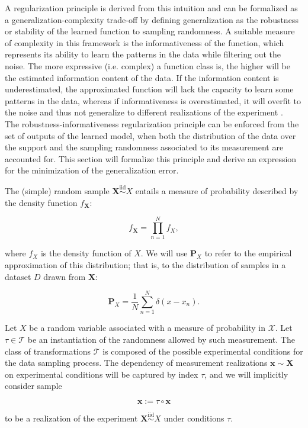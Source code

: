 A regularization principle is derived from this intuition and can be formalized as a
generalization-complexity trade-off by defining generalization as the robustness or stability
of the learned function to sampling randomness. A suitable measure of complexity in this framework
is the informativeness of the function, which represents its ability to learn the patterns in the
data while filtering out the noise. The more expressive (i.e. complex) a function class is,
the higher will be the estimated information content of the data. If the information content is
underestimated, the approximated function will lack the capacity to learn some patterns in
the data, whereas if informativeness is overestimated, it will overfit to the noise and 
thus not generalize to different realizations of the experiment
\cite{chehreghaniInformationTheoreticModel,buhmannInformationTheoreticModel,buhmannInformationTheoreticModel2010}. \\

The robustness-informativeness regularization principle can be enforced from the set 
of outputs of the learned model, when both the distribution of the data over the support 
and the sampling randomness associated to its measurement are accounted for. This section 
will formalize this principle and derive an expression for the minimization of
the generalization error.

\begin{definition}\label{def:data_distribution}
    The (simple) random sample $\bm{X} \overset{\text{iid}}{\sim} X$ entails a measure of probability
    described by the density function $f_{\bm{X}}$:

    $$
     f_{\bm{X}} = \prod_{n=1}^{N} f_{X},
    $$

    where $f_{X}$ is the density function of $X$. We will use $\mathbf{P}_{X}$ to refer to the empirical approximation of this distribution; 
    that is, to the distribution of samples in a dataset $D$ drawn from $\bm{X}$:

    $$
    \mathbf{P}_{X} = \frac{1}{N} \sum_{n=1}^{N} \delta(x - x_n).
    $$

\end{definition}

\begin{definition}\label{def:sample}
    Let $X$ be a random variable associated with a measure of probability
    in $\mathcal{X}$. Let $\tau \in \mathcal{T}$ be an instantiation of the randomness allowed
    by such measurement. The class of transformations $\mathcal{T}$ is composed
    of the possible experimental conditions for the data sampling 
    process. The dependency of measurement 
    realizations $\bm{x} \sim \bm{X}$ on experimental conditions 
    will be captured by index $\tau$, and we will implicitly consider sample
    
    $$
        \bm{x} := \tau \circ \bm{x}
    $$

    to be a realization of the experiment $\bm{X} \overset{\text{iid}}{\sim} X$ under conditions $\tau$.
\end{definition}

